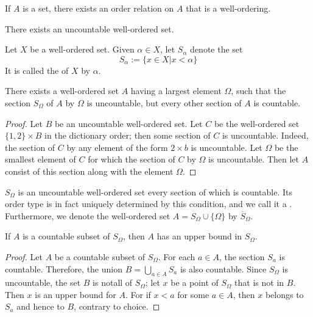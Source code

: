 \documentclass[12pt, a4paper, oneside, openright, titlepage]{book}
\begin{document}
\begin{appendices}
    \begin{namthm}
        If $A$ is a set, there exists an order relation on $A$ that is a well-ordering.
    \end{namthm}


    \begin{cor}
        There exists an uncountable well-ordered set.
    \end{cor}


    \begin{defn}
        Let $X$ be a well-ordered set. Given $\alpha \in X$, let $S_{\alpha}$ denote the set \begin{equation*}
            S_{\alpha} := \{x \in X\vert x < \alpha\}
        \end{equation*}
        It is called the  of $X$ by $\alpha$.
    \end{defn}


    \begin{lem}
        There exists a well-ordered set $A$ having a largest element $\Omega$, such that the section $S_{\Omega}$ of $A$ by $\Omega$ is uncountable, but every other section of $A$ is countable.
    \end{lem}
    \begin{proof}
        Let $B$ be an uncountable well-ordered set. Let $C$ be the well-ordered set $\{1,2\}\times B$ in the dictionary order; then some section of $C$ is uncountable. Indeed, the section of $C$ by any element of the form $2\times b$ is uncountable. Let $\Omega$ be the smallest element of $C$ for which the section of $C$ by $\Omega$ is uncountable. Then let $A$ consist of this section along with the element $\Omega$.
    \end{proof}

    \begin{rmk}
        $S_{\Omega}$ is an uncountable well-ordered set every section of which is countable. Its order type is in fact uniquely determined by this condition, and we call it a . Furthermore, we denote the well-ordered set $A = S_{\Omega}\cup\{\Omega\}$ by $\overline{S}_{\Omega}$.
    \end{rmk}

    \begin{thm}
        If $A$ is a countable subset of $S_{\Omega}$, then $A$ has an upper bound in $S_{\Omega}$.
    \end{thm}
    \begin{proof}
        Let $A$ be a countable subset of $S_{\Omega}$. For each $a \in A$, the section $S_a$ is countable. Therefore, the union $B = \bigcup_{a\in A}S_a$ is also countable. Since $S_{\Omega}$ is uncountable, the set $B$ is notall of $S_{\Omega}$; let $x$ be a point of $S_{\Omega}$ that is not in $B$. Then $x$ is an upper bound for $A$. For if $x < a$ for some $a \in A$, then $x$ belongs to $S_a$ and hence to $B$, contrary to choice.
    \end{proof}



\end{appendices}
\end{document}

